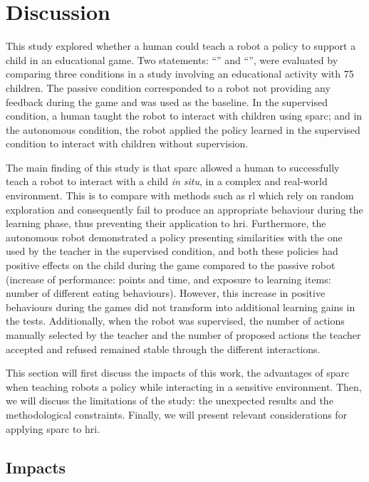\section{Discussion} \label{sec:tutoring_discussion}

This study explored whether a human could teach a robot a policy to support a child in an educational game. Two statements: ``\QI'' and ``\QII'', were evaluated by comparing three conditions in a study involving an educational activity with 75 children. The passive condition corresponded to a robot not providing any feedback during the game and was used as the baseline. In the supervised condition, a human taught the robot to interact with children using \gls{sparc}; and in the autonomous condition, the robot applied the policy learned in the supervised condition to interact with children without supervision.

The main finding of this study is that \gls{sparc} allowed a human to successfully teach a robot to interact with a child \textit{in situ}, in a complex and real-world environment. This is to compare with methods such as \gls{rl} which rely on random exploration and consequently fail to produce an appropriate behaviour during the learning phase, thus preventing their application to \gls{hri}. Furthermore, the autonomous robot demonstrated a policy presenting similarities with the one used by the teacher in the supervised condition, and both these policies had positive effects on the child during the game compared to the passive robot (increase of performance: points and time, and exposure to learning items: number of different eating behaviours). However, this increase in positive behaviours during the games did not transform into additional learning gains in the tests. Additionally, when the robot was supervised, the number of actions manually selected by the teacher and the number of proposed actions the teacher accepted and refused remained stable through the different interactions.

This section will first discuss the impacts of this work, the advantages of \gls{sparc} when teaching robots a policy while interacting in a sensitive environment. Then, we will discuss the limitations of the study: the unexpected results and the methodological constraints. Finally, we will present relevant considerations for applying \gls{sparc} to \gls{hri}.

\subsection{Impacts} \label{sec:tuto_impacts}


